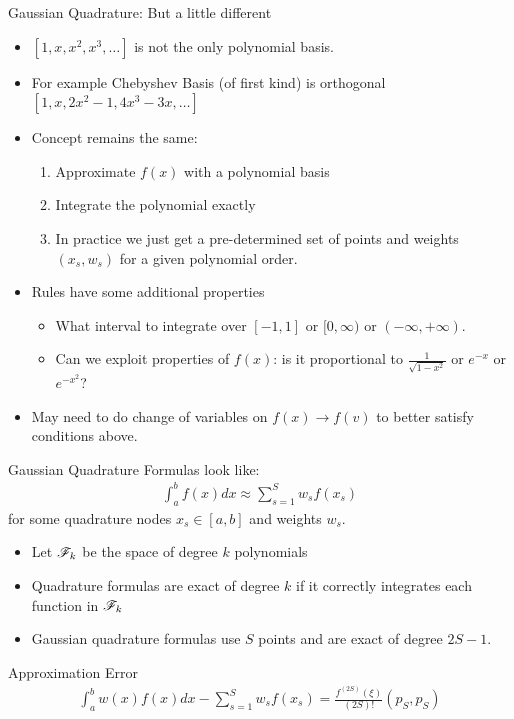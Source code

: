 \documentclass[aspectratio=169,11pt]{beamer}
\begin{document}
\begin{frame}{Gaussian Quadrature: But a little different}

\begin{itemize}
\item $[1,x,x^2,x^3,\ldots]$ is not the only \alert{polynomial basis}.
\item For example \alert{Chebyshev Basis} (of first kind) is \alert{orthogonal} $[1,x,2x^2-1,4x^3-3x,\ldots]$
\item Concept remains the same:
\begin{enumerate}
\item Approximate $f(x)$ with a polynomial basis
\item Integrate the polynomial exactly
\item In practice we just get a pre-determined set of points and weights $(x_s,w_s)$ for a given polynomial order.
\end{enumerate}
\item Rules have some additional properties
\begin{itemize}
\item What interval to integrate over $[-1,1]$ or $[0,\infty)$ or $(-\infty,+\infty)$.
\item Can we exploit properties of $f(x)$: is it proportional to $\frac{1}{\sqrt{1-x^2}}$ or $e^{-x}$ or $e^{-x^2}$?
\end{itemize}
\item May need to do change of variables on $f(x) \rightarrow f(v)$ to better satisfy conditions above.
\end{itemize}
\end{frame}


\begin{frame}{Gaussian Quadrature}
\small
Formulas look like:
\begin{eqnarray*}
\int_{a}^b f(x) d x \approx \sum_{s=1}^S  w_s f(x_s)
\end{eqnarray*}
for some quadrature nodes $x_s \in [a,b]$ and weights $w_s$.
\begin{itemize}
\item Let $\mathscr{F}_k$ be the space of degree $k$ polynomials
\item Quadrature formulas are exact of degree $k$ if it correctly integrates each function in $\mathscr{F}_k$
\item Gaussian quadrature formulas use $S$ points and are exact of degree $2S-1$.
\end{itemize}
Approximation Error
\begin{eqnarray*}
\int_a^b w(x) f(x)  dx - \sum_{s=1}^S w_s f(x_s) = \frac{f^{(2S)}(\xi)}{(2S)!} (p_S,p_S) 
\end{eqnarray*}
\end{frame}
\end{document}
